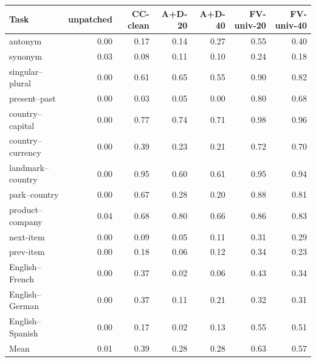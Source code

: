 \begin{tabular}{lrrrrrr}
\toprule
Task & unpatched & CC-clean & A+D-20 & A+D-40 & FV-univ-20 & FV-univ-40 \\
\midrule
antonym & 0.00 & 0.17 & 0.14 & 0.27 & 0.55 & 0.40 \\
synonym & 0.03 & 0.08 & 0.11 & 0.10 & 0.24 & 0.18 \\
singular--plural & 0.00 & 0.61 & 0.65 & 0.55 & 0.90 & 0.82 \\
present--past & 0.00 & 0.03 & 0.05 & 0.00 & 0.80 & 0.68 \\
country--capital & 0.00 & 0.77 & 0.74 & 0.71 & 0.98 & 0.96 \\
country--currency & 0.00 & 0.39 & 0.23 & 0.21 & 0.72 & 0.70 \\
landmark--country & 0.00 & 0.95 & 0.60 & 0.61 & 0.95 & 0.94 \\
park--country & 0.00 & 0.67 & 0.28 & 0.20 & 0.88 & 0.81 \\
product--company & 0.04 & 0.68 & 0.80 & 0.66 & 0.86 & 0.83 \\
next-item & 0.00 & 0.09 & 0.05 & 0.11 & 0.31 & 0.29 \\
prev-item & 0.00 & 0.18 & 0.06 & 0.12 & 0.34 & 0.23 \\
English--French & 0.00 & 0.37 & 0.02 & 0.06 & 0.43 & 0.34 \\
English--German & 0.00 & 0.37 & 0.11 & 0.21 & 0.32 & 0.31 \\
English--Spanish & 0.00 & 0.17 & 0.02 & 0.13 & 0.55 & 0.51 \\
\midrule
Mean & 0.01 & 0.39 & 0.28 & 0.28 & 0.63 & 0.57 \\
\bottomrule
\end{tabular}
